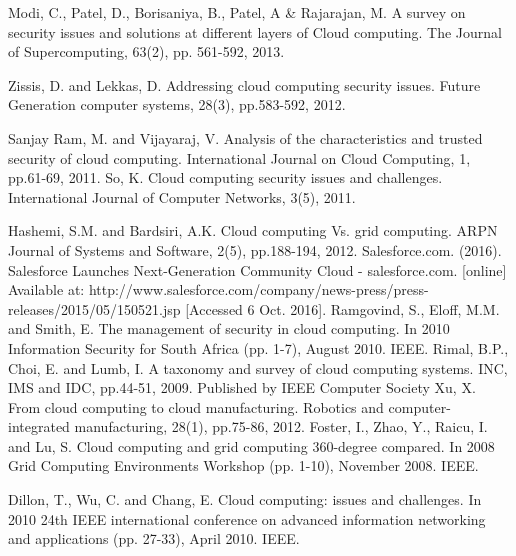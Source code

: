 \documentclass[10pt,journal,compsoc]{IEEEtran}
\begin{document}
\begin{thebibliography}{1}
\bibitem{}
Modi, C., Patel, D., Borisaniya, B., Patel, A \& Rajarajan, M. A survey on security issues and solutions at different layers of Cloud computing. The Journal of Supercomputing, 63(2), pp. 561-592, 2013.

\vspace{5mm}
\bibitem{}
Zissis, D. and Lekkas, D. Addressing cloud computing security issues. Future Generation computer systems, 28(3), pp.583-592, 2012.
\vspace{5mm}

\bibitem{}
Sanjay Ram, M. and Vijayaraj, V. Analysis of the characteristics and trusted security of cloud computing. International Journal on Cloud Computing, 1, pp.61-69, 2011.
\vspace{5mm}
\bibitem{}
So, K. Cloud computing security issues and challenges. International Journal of Computer Networks, 3(5), 2011.

\vspace{5mm}
\bibitem{}
Hashemi, S.M. and Bardsiri, A.K. Cloud computing Vs. grid computing. ARPN Journal of Systems and Software, 2(5), pp.188-194, 2012.
\vspace{5mm}
\bibitem{}
Salesforce.com. (2016). Salesforce Launches Next-Generation Community Cloud - salesforce.com. [online] Available at: http://www.salesforce.com/company/news-press/press-releases/2015/05/150521.jsp [Accessed 6 Oct. 2016].
\vspace{5mm}
\bibitem{}
Ramgovind, S., Eloff, M.M. and Smith, E. The management of security in cloud computing. In 2010 Information Security for South Africa (pp. 1-7), August 2010. IEEE.
\vspace{5mm}
\bibitem{}
Rimal, B.P., Choi, E. and Lumb, I. A taxonomy and survey of cloud computing systems. INC, IMS and IDC, pp.44-51, 2009. Published by IEEE Computer Society
\vspace{5mm}
\bibitem{}
Xu, X. From cloud computing to cloud manufacturing. Robotics and computer-integrated manufacturing, 28(1), pp.75-86, 2012.
\vspace{5mm}
\bibitem{}
Foster, I., Zhao, Y., Raicu, I. and Lu, S. Cloud computing and grid computing 360-degree compared. In 2008 Grid Computing Environments Workshop (pp. 1-10), November 2008. IEEE.

\vspace{5mm}
\bibitem{}
Dillon, T., Wu, C. and Chang, E. Cloud computing: issues and challenges. In 2010 24th IEEE international conference on advanced information networking and applications (pp. 27-33), April 2010. IEEE.
\vspace{5mm}


\end{thebibliography}
\end{document}
